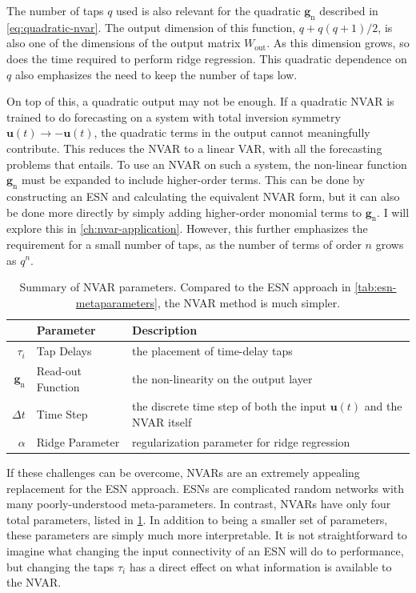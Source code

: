 The number of taps $q$ used is also relevant for the quadratic
$\bm{g}_\text{n}$ described in \cref{eq:quadratic-nvar}. The output
dimension of this function, $q + q(q + 1)/2$, is also one of the
dimensions of the output matrix $W_\text{out}$. As this dimension
grows, so does the time required to perform ridge regression. This
quadratic dependence on $q$ also emphasizes the need to keep the
number of taps low.

On top of this, a quadratic output may not be enough. If a quadratic
NVAR is trained to do forecasting on a system with total inversion
symmetry $\bm{u}(t) \rightarrow -\bm{u}(t)$, the quadratic terms in
the output cannot meaningfully contribute. This reduces the NVAR to a
linear VAR, with all the forecasting problems that entails. To use an
NVAR on such a system, the non-linear function $\bm{g}_\text{n}$ must
be expanded to include higher-order terms. This can be done by
constructing an ESN and calculating the equivalent NVAR form, but it
can also be done more directly by simply adding higher-order monomial terms to
$\bm{g}_\text{n}$. I will explore this in
\cref{ch:nvar-application}. However, this further emphasizes the
requirement for a small number of taps, as the number of terms of
order $n$ grows as $q^n$.

\begin{table}
  \caption{Summary of NVAR parameters. Compared to the ESN approach in
    \cref{tab:esn-metaparameters}, the NVAR method is much simpler.}
  \begin{tabularx}{\linewidth}{rlX}
    & Parameter & Description \\
    \hline
    \rule{0pt}{4ex}
    $\tau_i$ & Tap Delays & the placement of time-delay taps \\
    \rule{0pt}{4ex}
    $\bm{g}_\text{n}$ & Read-out Function & the non-linearity on the output layer \\
    \rule{0pt}{4ex}
    $\Delta t$ & Time Step & the discrete time step of both the input $\bm{u}(t)$ and the NVAR itself \\
    \rule{0pt}{4ex}
    $\alpha$ & Ridge Parameter & regularization parameter for ridge regression \\
  \end{tabularx}
  \label{tab:nvar-parameters}
\end{table}

If these challenges can be overcome, NVARs are an extremely appealing
replacement for the ESN approach. ESNs are complicated random networks
with many poorly-understood meta-parameters. In contrast, NVARs have
only four total parameters, listed in \cref{tab:nvar-parameters}.  In
addition to being a smaller set of parameters, these parameters are
simply much more interpretable. It is not straightforward to imagine
what changing the input connectivity of an ESN will do to performance,
but changing the taps $\tau_i$ has a direct effect on what information
is available to the NVAR.

